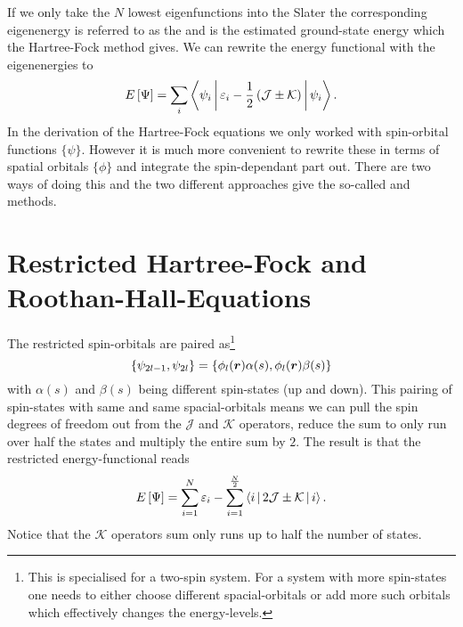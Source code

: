         If we only take the $N$ lowest eigenfunctions into the Slater the
        corresponding eigenenergy is referred to as the  and is the estimated ground-state energy which the Hartree-Fock
        method gives. We can rewrite the energy functional with the
        eigenenergies to
            \begin{equation}
                E\left[\Psi\right] = \sum_i\Braket{\psi_i | \varepsilon_i -
                \frac{1}{2}\left(\mathcal{J} \pm \mathcal{K}\right) | \psi_i}
                \label{eq:energyJKHF}.
            \end{equation}
        In the derivation of the Hartree-Fock equations we only worked with
        spin-orbital functions $\{\psi\}$. However it is much more convenient
        to rewrite these in terms of spatial orbitals $\{\phi\}$ and integrate
        the spin-dependant part out. There are two ways of doing this and the
        two different approaches give the so-called  and  methods.

    \section{Restricted Hartree-Fock and Roothan-Hall-Equations}
        The restricted spin-orbitals are paired as\footnote{This is specialised
        for a two-spin system. For a system with more spin-states one needs to
        either choose different spacial-orbitals or add more such orbitals
        which effectively changes the energy-levels.}
            \begin{equation}
                \{\psi_{2l-1}, \psi_{2l}\} =
                \{\phi_l(\boldsymbol{{r}})\alpha(s),\phi_l(\boldsymbol{{r}})\beta(s)\}
                \label{eq:spinpairingHF}
            \end{equation}
        with $\alpha(s)$ and $\beta(s)$ being different spin-states (up and
        down). This pairing of spin-states with same and same spacial-orbitals
        means we can pull the spin degrees of freedom out from the
        $\mathcal{J}$ and $\mathcal{K}$ operators, reduce the sum to only run
        over half the states and multiply the entire sum by $2$. The result is
        that the restricted energy-functional reads
            \begin{equation}
                E\left[\Psi\right] = \sum\limits^N_{i=1}\varepsilon_i -
                \sum\limits^{\frac{N}{2}}_{i=1} \Braket{i | 2\mathcal{J}
                \pm \mathcal{K} | i}.
            \end{equation}
        Notice that the $\mathcal{K}$ operators sum only runs up to half the
        number of states.
        
